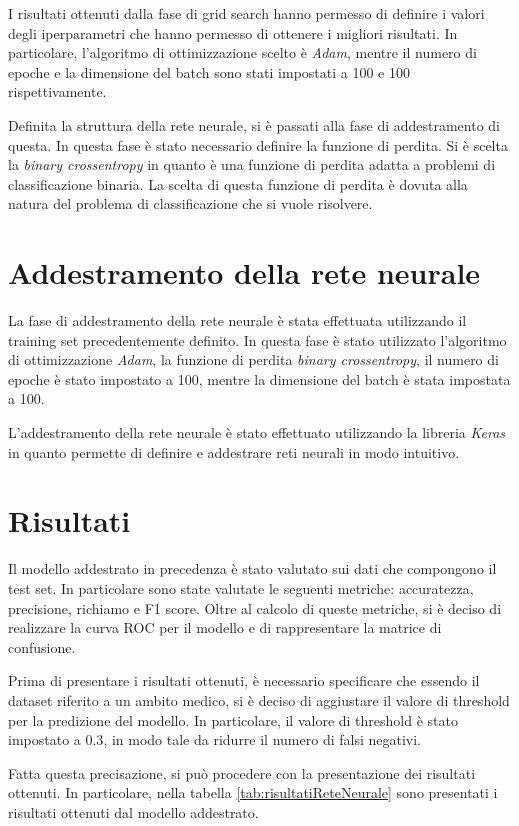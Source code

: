 I risultati ottenuti dalla fase di grid search hanno permesso di definire i valori
degli iperparametri che hanno permesso di ottenere i migliori risultati. In
particolare, l'algoritmo di ottimizzazione scelto è \textit{Adam}, mentre il
numero di epoche e la dimensione del batch sono stati impostati a 100 e 100
rispettivamente.

Definita la struttura della rete neurale, si è passati alla fase di addestramento
di questa. In questa fase è stato necessario definire la funzione di perdita. 
Si è scelta la \textit{binary crossentropy} in quanto è una funzione di perdita 
adatta a problemi di classificazione binaria. La scelta di questa funzione di 
perdita è dovuta alla natura del problema di classificazione che si vuole risolvere.

\section{Addestramento della rete neurale}
La fase di addestramento della rete neurale è stata effettuata utilizzando il
training set precedentemente definito. In questa fase è stato utilizzato
l'algoritmo di ottimizzazione \textit{Adam}, la funzione di perdita
\textit{binary crossentropy}, il numero di epoche è stato impostato a 100, mentre
la dimensione del batch è stata impostata a 100.

L'addestramento della rete neurale è stato effettuato utilizzando la libreria
\textit{Keras} in quanto permette di definire e addestrare reti neurali in modo
intuitivo.
\section{Risultati}
Il modello addestrato in precedenza è stato valutato sui dati che compongono il
test set. In particolare sono state valutate le seguenti metriche: accuratezza,
precisione, richiamo e F1 score. Oltre al calcolo di queste metriche, si è 
deciso di realizzare la curva ROC per il modello e di rappresentare la matrice
di confusione.

Prima di presentare i risultati ottenuti, è necessario specificare che essendo 
il dataset riferito a un ambito medico, si è deciso di aggiustare il valore di
threshold per la predizione del modello. In particolare, il valore di threshold
è stato impostato a $0.3$, in modo tale da ridurre il numero di falsi negativi.

Fatta questa precisazione, si può procedere con la presentazione dei risultati
ottenuti. In particolare, nella tabella \ref{tab:risultatiReteNeurale} sono
presentati i risultati ottenuti dal modello addestrato.

